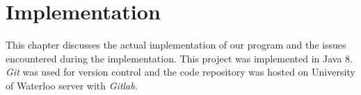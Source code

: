 \chapter{Implementation}
\label{implementation}
This chapter discusses the actual implementation of our program and the issues encountered during the implementation. This project was implemented in Java 8. \emph{Git} was used for version control and the code repository was hosted on University of Waterloo server with \emph{Gitlab}.


